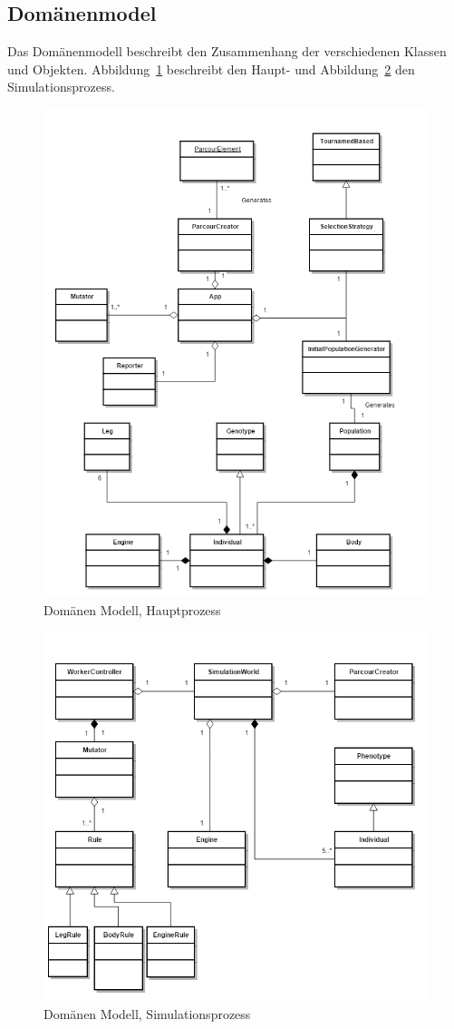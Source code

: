     \subsection{Domänenmodel\label{sub:domMod}}

      Das Domänenmodell beschreibt den Zusammenhang der verschiedenen Klassen und Objekten.
      Abbildung~\ref{fig:mainProcess} beschreibt den Haupt- und Abbildung~\ref{fig:simulationProcess} den Simulationsprozess.
      \begin{figure}[H]
        \includegraphics[scale=0.6]{graphics/main_process}
        \caption{Domänen Modell, Hauptprozess\label{fig:mainProcess}}
      \end{figure}
      \begin{figure}[H]
        \includegraphics[scale=0.6]{graphics/simulation_process}
        \caption{Domänen Modell, Simulationsprozess\label{fig:simulationProcess}}
      \end{figure}
